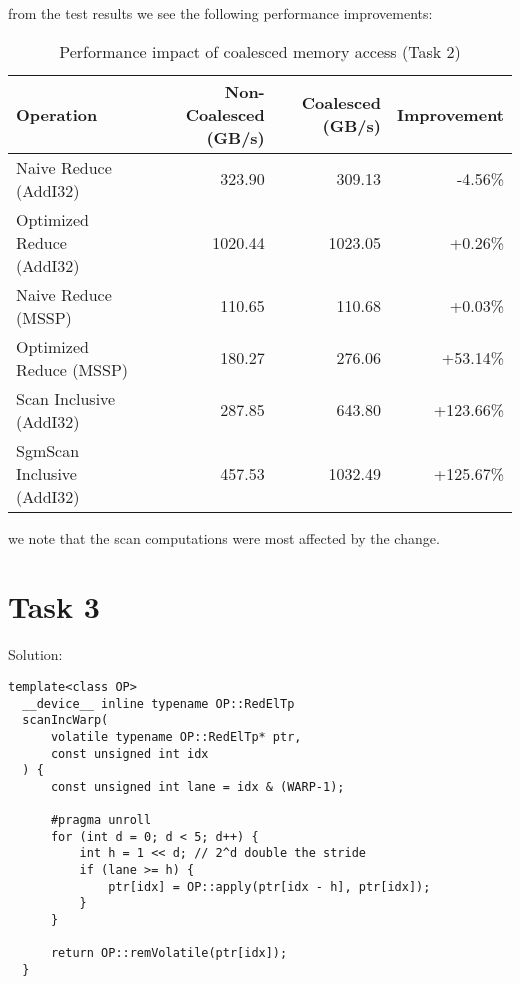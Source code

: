 \documentclass{article}
\begin{document}
  from the test results we see the following performance improvements:

  \begin{table}[h]
    \centering
    \begin{tabular}{|l|r|r|r|}
    \hline
    \textbf{Operation} & \textbf{Non-Coalesced (GB/s)} & \textbf{Coalesced (GB/s)} & \textbf{Improvement} \\
    \hline
    Naive Reduce (AddI32) & 323.90 & 309.13 & -4.56\% \\
    Optimized Reduce (AddI32) & 1020.44 & 1023.05 & +0.26\% \\
    Naive Reduce (MSSP) & 110.65 & 110.68 & +0.03\% \\
    Optimized Reduce (MSSP) & 180.27 & 276.06 & +53.14\% \\
    Scan Inclusive (AddI32) & 287.85 & 643.80 & +123.66\% \\
    SgmScan Inclusive (AddI32) & 457.53 & 1032.49 & +125.67\% \\
    \hline
    \end{tabular}
    \caption{Performance impact of coalesced memory access (Task 2)}
    \label{tab:task2_perf}
  \end{table}

  we note that the scan computations were most affected by the change.

\section{Task 3}

Solution:

\begin{lstlisting}[language=cuda]
  template<class OP>
  __device__ inline typename OP::RedElTp
  scanIncWarp( 
      volatile typename OP::RedElTp* ptr, 
      const unsigned int idx 
  ) {
      const unsigned int lane = idx & (WARP-1);
      
      #pragma unroll
      for (int d = 0; d < 5; d++) {
          int h = 1 << d; // 2^d double the stride
          if (lane >= h) {
              ptr[idx] = OP::apply(ptr[idx - h], ptr[idx]);
          }
      }
      
      return OP::remVolatile(ptr[idx]);
  }
\end{lstlisting}
\end{document}
